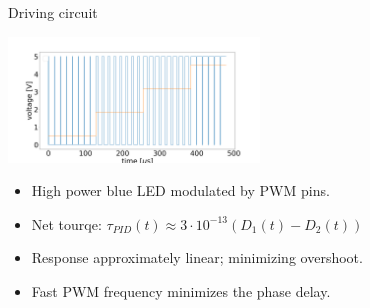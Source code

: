 \documentclass{beamer}
\begin{document}
\begin{frame}{Driving circuit}
	\begin{center}		
		\includegraphics[width=0.5\textwidth,keepaspectratio]{duty_cycle.png}
	\end{center}
	\begin{itemize}		
		\item High power blue LED modulated by PWM pins.
		\item Net tourqe: $\tau_{PID}(t)  \approx   3\cdot 10^{-13}(D_1(t) -D_2(t)) $
		\item Response approximately linear; minimizing overshoot.
		\item Fast PWM frequency minimizes the phase delay.
		
	\end{itemize}
\end{frame}
\end{document}
